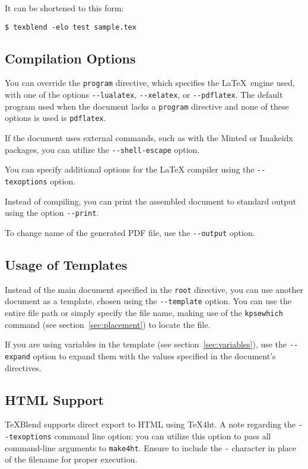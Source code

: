 It can be shortened to this form:

\begin{verbatim}
$ texblend -elo test sample.tex
\end{verbatim}



\subsection{Compilation Options}

You can override the \verb'program' directive, which specifies the \LaTeX\ engine
used, with one of the options \verb|--lualatex|, \verb|--xelatex|, or \verb|--pdflatex|. 
The default program used when the document lacks a \verb'program' directive and none of these
options is used is \verb|pdflatex|.

If the document uses external commands, such as with the Minted or Imakeidx
packages, you can utilize the \verb|--shell-escape| option.

You can specify additional options for the LaTeX compiler using the \verb|--texoptions| option.

Instead of compiling, you can print the assembled document to standard output
using the option \verb|--print|.

To change name of the generated PDF file, use the \verb|--output| option.


\subsection{Usage of Templates}


Instead of the main document specified in the \verb'root' directive, you can use
another document as a template, chosen using the \verb|--template| option. You
can use the entire file path or simply specify the file name, making use of the
\verb'kpsewhich' command (see section~\ref{sec:placement}) to locate the file.

If you are using variables in the template (see section~\ref{sec:variables}), use the
\verb'--expand' option to expand them with the values specified in the document's
directives.




\subsection{HTML Support}

\TeX Blend supports direct export to HTML using \TeX4ht. A note regarding the
\verb|--texoptions| command line option: you can utilize this option to pass all
command-line arguments to \verb|make4ht|. Ensure to include the \verb|-| character in place
of the filename for proper execution.

